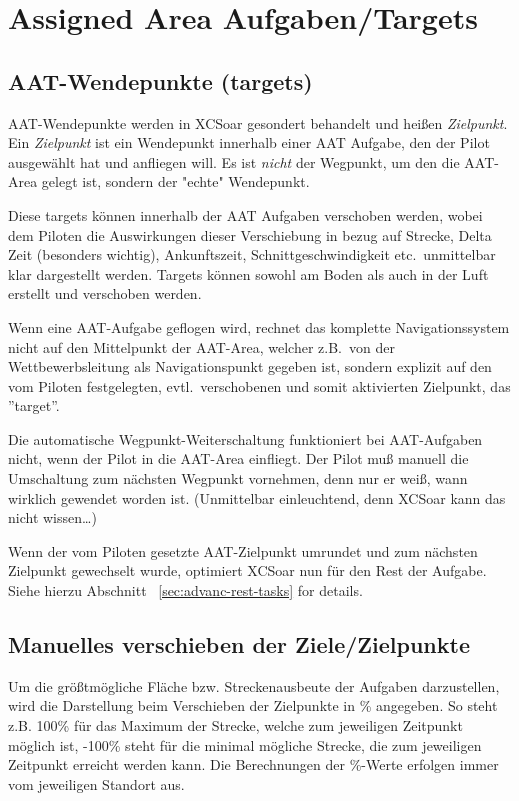 \section{Assigned Area Aufgaben/Targets}\label{sec:aat-tasks}
\subsection*{AAT-Wendepunkte (targets)}

AAT-Wendepunkte werden in \textsf{XCSoar} gesondert behandelt und heißen  \textcolor[rgb]{0.00,0.00,0.50}{{\em Zielpunkt}}. Ein  {\em Zielpunkt } ist ein Wendepunkt innerhalb einer AAT Aufgabe, den der Pilot ausgewählt hat und anfliegen will. Es ist \textsl{nicht} der Wegpunkt, um den die AAT-Area gelegt ist, sondern der "echte" Wendepunkt.

Diese targets können innerhalb der AAT Aufgaben verschoben werden, wobei dem Piloten die Auswirkungen dieser Verschiebung in bezug auf Strecke, Delta Zeit (besonders wichtig), Ankunftszeit, Schnittgeschwindigkeit etc.\ unmittelbar klar dargestellt werden.  Targets können sowohl am Boden als auch in der Luft erstellt und verschoben werden.

Wenn eine AAT-Aufgabe geflogen wird, rechnet das komplette Navigationssystem nicht auf den Mittelpunkt der AAT-Area, welcher z.B.\ von der Wettbewerbsleitung als Navigationspunkt gegeben ist, sondern explizit auf den vom Piloten festgelegten, evtl.\ verschobenen und  somit aktivierten Zielpunkt, das ''target''.

Die automatische Wegpunkt-Weiterschaltung  funktioniert bei AAT-Aufgaben nicht, wenn der Pilot in die AAT-Area einfliegt. Der Pilot muß manuell  die Umschaltung zum nächsten Wegpunkt vornehmen, denn nur er weiß, wann wirklich gewendet worden ist. (Unmittelbar einleuchtend, denn \textsf{XCSoar} kann das nicht wissen\dots)

Wenn der vom Piloten gesetzte AAT-Zielpunkt umrundet und zum nächsten Zielpunkt gewechselt wurde, optimiert \textsf{XCSoar} nun für den Rest der Aufgabe. Siehe hierzu Abschnitt ~\ref{sec:advanc-rest-tasks} for details.


\subsection*{Manuelles verschieben der Ziele/Zielpunkte}

Um die größtmögliche Fläche bzw. Streckenausbeute der Aufgaben darzustellen, wird die Darstellung beim Verschieben der Zielpunkte  in \% angegeben.  So steht z.B. 100\% für das Maximum der Strecke, welche zum jeweiligen Zeitpunkt möglich ist, -100\% steht für die minimal mögliche Strecke, die zum jeweiligen Zeitpunkt erreicht werden kann. Die Berechnungen der \%-Werte erfolgen immer vom jeweiligen Standort aus.

